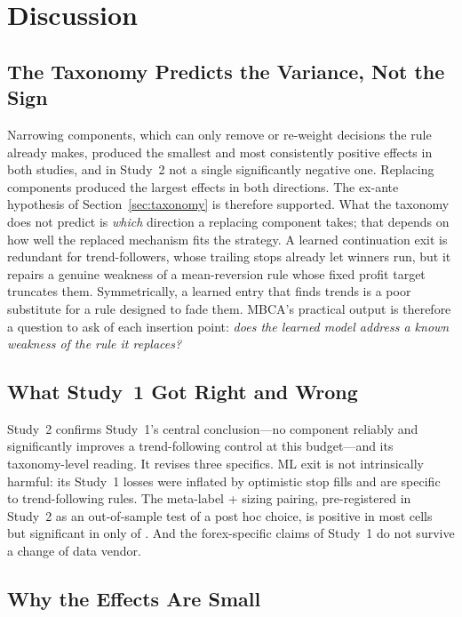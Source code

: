 \section{Discussion}
\label{sec:discussion}

\subsection{The Taxonomy Predicts the Variance, Not the Sign}

Narrowing components, which can only remove or re-weight decisions the rule already makes, produced the smallest and
most consistently positive effects in both studies, and in Study~2 not a single significantly negative one. Replacing
components produced the largest effects in both directions. The ex-ante hypothesis of Section~\ref{sec:taxonomy} is
therefore supported. What the taxonomy does not predict is \emph{which} direction a replacing component takes; that
depends on how well the replaced mechanism fits the strategy. A learned continuation exit is redundant for
trend-followers, whose trailing stops already let winners run, but it repairs a genuine weakness of a mean-reversion
rule whose fixed profit target truncates them. Symmetrically, a learned entry that finds trends is a poor substitute
for a rule designed to fade them. MBCA's practical output is therefore a question to ask of each insertion point:
\emph{does the learned model address a known weakness of the rule it replaces?}

\subsection{What Study~1 Got Right and Wrong}

Study~2 confirms Study~1's central conclusion---no component reliably and significantly improves a trend-following
control at this budget---and its taxonomy-level reading. It revises three specifics. ML exit is not intrinsically
harmful: its Study~1 losses were inflated by optimistic stop fills and are specific to trend-following rules. The
meta-label + sizing pairing, pre-registered in Study~2 as an out-of-sample test of a post hoc choice, is positive in
most cells but significant in only \STwoMktBestGain{} of \STwoMktBestN{}. And the forex-specific claims of Study~1 do
not survive a change of data vendor.

\subsection{Why the Effects Are Small}

